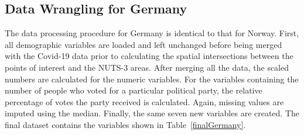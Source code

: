 \subsection{Data Wrangling for Germany}
The data processing procedure for Germany is identical to that for Norway. First, all demographic variables are loaded and left unchanged before being merged with the Covid-19 data prior to calculating the spatial intersections between the points of interest and the NUTS-3 areas. After merging all the data, the scaled numbers are calculated for the numeric variables. For the variables containing the number of people who voted for a particular political party, the relative percentage of votes the party received is calculated. Again, missing values are imputed using the median.
Finally, the same seven new variables are created. 
The final dataset contains the variables shown in Table~\ref{finalGermany}.
